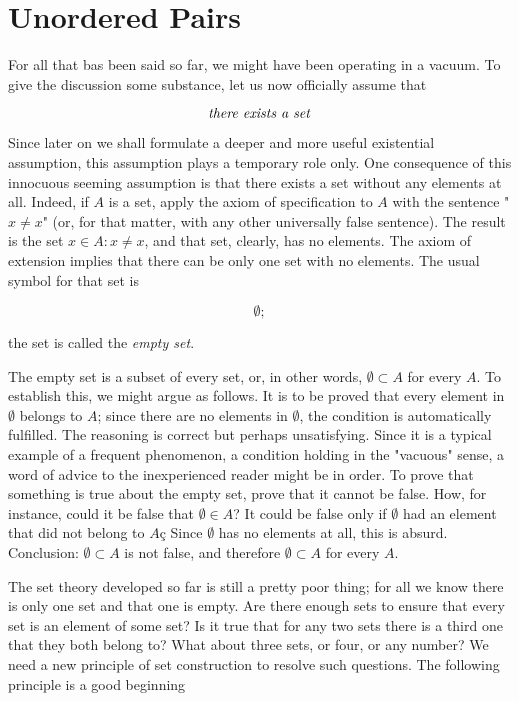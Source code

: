 
\chapter{Unordered Pairs} 

For all that bas been said so far, we might have been operating in a vacuum. To give the discussion some substance, let us now officially assume that

\begin{equation*}
\text{ \textit{there exists a set} }
\end{equation*}
 
Since later on we shall formulate a deeper and more useful existential assumption, this  assumption  plays  a temporary role only. One consequence of this innocuous seeming assumption is that there exists a set without any elements at all. Indeed, if $A$ is a set, apply the axiom of specification to $A$ with the sentence "$ x \neq x $"  (or, for that matter, with any other universally false sentence). The result is the set ${x \in A: x \neq x}$, and that set, clearly, has no elements. The axiom of extension implies that there can be only one set with no elements. The usual symbol for that set is 

\begin{equation*}
\emptyset ;
\end{equation*}


the set is called the \textit{empty set}. 

The empty set is a subset of every set, or, in other words, $ \emptyset \subset A$ for every $A$. To establish this, we might argue as follows. It is to be proved that every element in $ \emptyset $ belongs to $A$; since there are no elements in $ \emptyset $, the condition is automatically fulfilled. The reasoning is correct but perhaps unsatisfying. Since it is a typical example of a frequent phenomenon, a condition holding in the "vacuous" sense, a word of advice to the inexperienced reader might be in order. To prove that something is true about the empty set, prove that it cannot be false. How, for instance, could it be false that $ \emptyset \in  A$? It could be false only if $ \emptyset $ had an element that did not belong to $A$ç Since $ \emptyset $ has no elements at all, this is absurd. Conclusion: $ \emptyset \subset A$ is not false, and therefore $ \emptyset \subset A$ for every $A$.

The set theory developed so far is still a pretty poor thing; for all we know there is only one set and that one is empty. Are there enough sets to ensure that every set is an element of some set? Is it true that for any two sets there is a third one that they both belong to? What about three sets, or four, or any number? We need a new principle of set construction to resolve such questions. The following principle is a good beginning 


